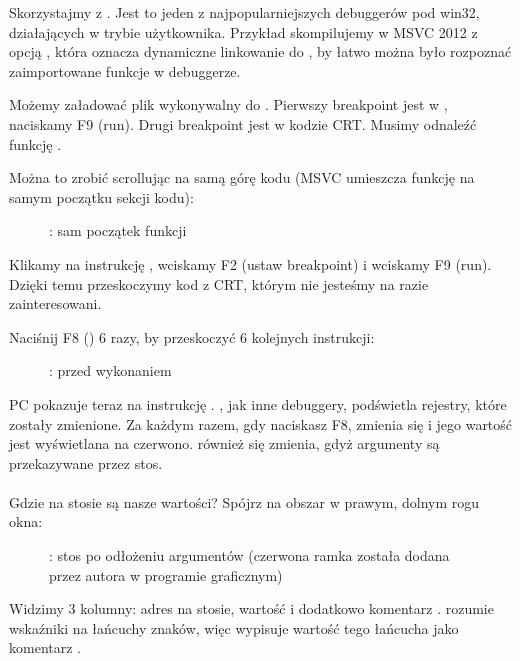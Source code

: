 Skorzystajmy z \olly.
Jest to jeden z najpopularniejszych debuggerów pod win32, działających w trybie użytkownika.
Przykład skompilujemy w MSVC 2012 z opcją , która oznacza dynamiczne linkowanie do ,
by łatwo można było rozpoznać zaimportowane funkcje w debuggerze.

Możemy załadować plik wykonywalny do \olly.
Pierwszy breakpoint jest w , naciskamy
F9 (run).
Drugi breakpoint jest w kodzie \ac{CRT}.
Musimy odnaleźć funkcję \main.

Można to zrobić scrollując na samą górę kodu (MSVC umieszcza funkcję \main na samym początku sekcji kodu):
\begin{figure}[H]
\centering
{}
\caption{\olly: sam początek funkcji \main}
\label{fig:printf3_olly_1}
\end{figure}

Klikamy na instrukcję , wciskamy F2 (ustaw breakpoint) i wciskamy F9 (run).
Dzięki temu przeskoczymy kod z \ac{CRT}, którym nie jesteśmy na razie zainteresowani.

\clearpage
Naciśnij F8 (\stepover) 6 razy, by przeskoczyć 6 kolejnych instrukcji:

\begin{figure}[H]
\centering
{}
\caption{\olly: przed wykonaniem \printf}
\label{fig:printf3_olly_2}
\end{figure}

\ac{PC} pokazuje teraz na instrukcję .
\olly, jak inne debuggery, podświetla rejestry, które zostały zmienione.
Za każdym razem, gdy naciskasz F8, \EIP zmienia się i jego wartość jest wyświetlana na czerwono. \ESP również się zmienia, gdyż argumenty są przekazywane przez stos.\\
\\
Gdzie na stosie są nasze wartości?
Spójrz na obszar w prawym, dolnym rogu okna:

\begin{figure}[H]
\centering

\caption{\olly: stos po odłożeniu argumentów (czerwona ramka została dodana przez autora w programie graficznym)}
\end{figure}

Widzimy 3 kolumny: adres na stosie, wartość i dodatkowo komentarz \olly.
\olly rozumie wskaźniki na łańcuchy znaków, więc wypisuje wartość tego łańcucha jako komentarz .

